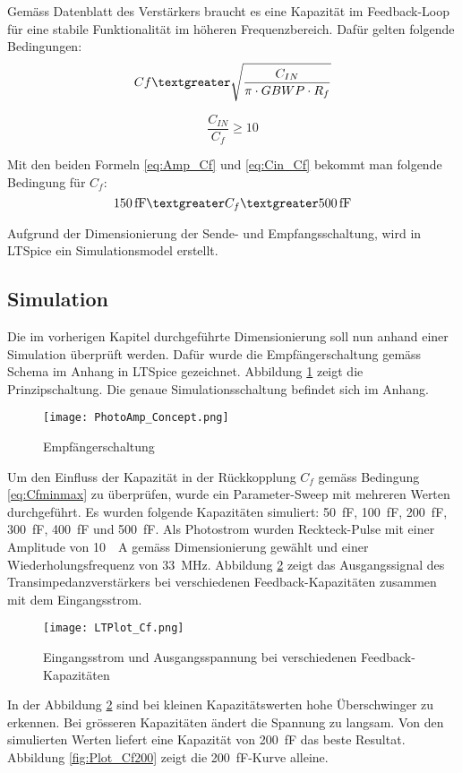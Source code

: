 Gemäss Datenblatt \cite{ltc6268} des Verstärkers braucht es eine Kapazität im Feedback-Loop für eine stabile Funktionalität im höheren Frequenzbereich. Dafür gelten folgende Bedingungen:
\begin{equation}\label{eq:Amp_Cf}
C{f}\textgreater \sqrt{\frac{C_{IN}}{\pi\cdot GBWP\cdot R_{f}}}
\end{equation}

\begin{equation}\label{eq:Cin_Cf}
\frac{C_{IN}}{C_{f}}\geq 10
\end{equation}

Mit den beiden Formeln \ref{eq:Amp_Cf} und \ref{eq:Cin_Cf} bekommt man folgende Bedingung für $C_{f}$: 
\begin{equation}\label{eq:Cfminmax}
\SI{150}{fF}\textgreater C_{f}\textgreater \SI{500}{fF}
\end{equation}

Aufgrund der Dimensionierung der Sende- und Empfangsschaltung, wird in LTSpice ein Simulationsmodel erstellt.

\subsection{Simulation}
Die im vorherigen Kapitel durchgeführte Dimensionierung soll nun anhand einer Simulation überprüft werden.
Dafür wurde die Empfängerschaltung gemäss Schema im Anhang in LTSpice gezeichnet. Abbildung \ref{fig:PhotoAmp_Concept} zeigt die Prinzipschaltung. Die genaue Simulationsschaltung befindet sich im Anhang.
\begin{figure}[h]
	\centering
	\texttt{[image: PhotoAmp\_Concept.png]}
	\caption{Empfängerschaltung}\label{fig:PhotoAmp_Concept}
\end{figure}

Um den Einfluss der Kapazität in der Rückkopplung $C_{f}$ gemäss Bedingung \ref{eq:Cfminmax} zu überprüfen, wurde ein Parameter-Sweep mit mehreren Werten durchgeführt. Es wurden folgende Kapazitäten simuliert: \SI{50}{fF}, \SI{100}{fF}, \SI{200}{fF}, \SI{300}{fF}, \SI{400}{fF} und \SI{500}{fF}. Als Photostrom wurden Reckteck-Pulse mit einer Amplitude von \SI{10}{\mu A} gemäss Dimensionierung gewählt und einer Wiederholungsfrequenz von \SI{33}{MHz}.
Abbildung \ref{fig:Plot_Cf} zeigt das Ausgangssignal des Transimpedanzverstärkers bei verschiedenen Feedback-Kapazitäten zusammen mit dem Eingangsstrom.
\begin{figure}[H]
	\centering
	\texttt{[image: LTPlot\_Cf.png]}
	\caption{Eingangsstrom und Ausgangsspannung bei verschiedenen Feedback-Kapazitäten}\label{fig:Plot_Cf}
\end{figure}
In der Abbildung \ref{fig:Plot_Cf} sind bei kleinen Kapazitätswerten hohe Überschwinger zu erkennen. Bei grösseren Kapazitäten ändert die Spannung zu langsam. Von den simulierten Werten liefert eine Kapazität von \SI{200}{fF} das beste Resultat. Abbildung \ref{fig:Plot_Cf200} zeigt die \SI{200}{fF}-Kurve alleine.

